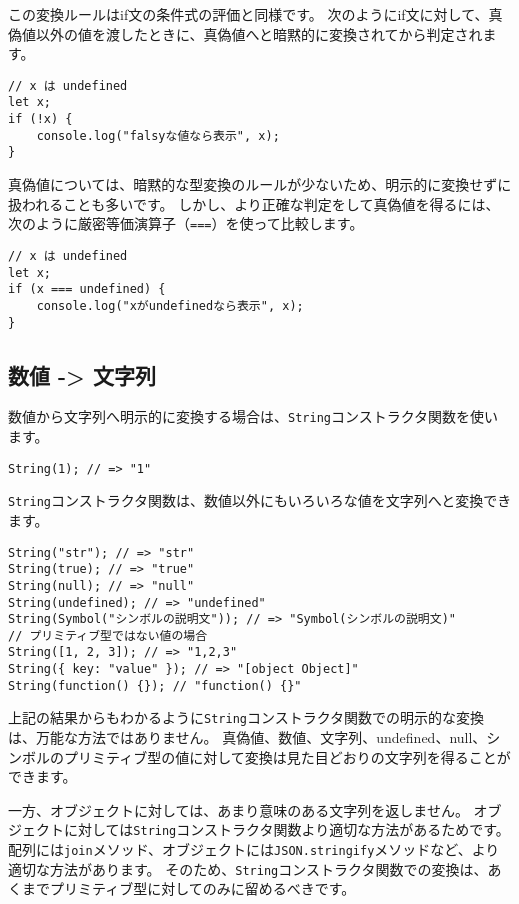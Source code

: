 この変換ルールはif文の条件式の評価と同様です。
次のようにif文に対して、真偽値以外の値を渡したときに、真偽値へと暗黙的に変換されてから判定されます。

\begin{lstlisting}
// x は undefined
let x; 
if (!x) {
    console.log("falsyな値なら表示", x); 
}
\end{lstlisting}

真偽値については、暗黙的な型変換のルールが少ないため、明示的に変換せずに扱われることも多いです。
しかし、より正確な判定をして真偽値を得るには、次のように厳密等価演算子（\texttt{===}）を使って比較します。

\begin{lstlisting}
// x は undefined
let x;
if (x === undefined) {
    console.log("xがundefinedなら表示", x); 
}
\end{lstlisting}

\hypertarget{number-to-string}{%
\subsection{数値 -\textgreater{} 文字列}\label{number-to-string}}

数値から文字列へ明示的に変換する場合は、\texttt{String}コンストラクタ関数を使います。

\begin{lstlisting}
String(1); // => "1"
\end{lstlisting}

\texttt{String}コンストラクタ関数は、数値以外にもいろいろな値を文字列へと変換できます。

\begin{lstlisting}
String("str"); // => "str"
String(true); // => "true"
String(null); // => "null"
String(undefined); // => "undefined"
String(Symbol("シンボルの説明文")); // => "Symbol(シンボルの説明文)"
// プリミティブ型ではない値の場合
String([1, 2, 3]); // => "1,2,3"
String({ key: "value" }); // => "[object Object]"
String(function() {}); // "function() {}"
\end{lstlisting}

上記の結果からもわかるように\texttt{String}コンストラクタ関数での明示的な変換は、万能な方法ではありません。
真偽値、数値、文字列、undefined、null、シンボルのプリミティブ型の値に対して変換は見た目どおりの文字列を得ることができます。

一方、オブジェクトに対しては、あまり意味のある文字列を返しません。
オブジェクトに対しては\texttt{String}コンストラクタ関数より適切な方法があるためです。
配列には\texttt{join}メソッド、オブジェクトには\texttt{JSON.stringify}メソッドなど、より適切な方法があります。
そのため、\texttt{String}コンストラクタ関数での変換は、あくまでプリミティブ型に対してのみに留めるべきです。

